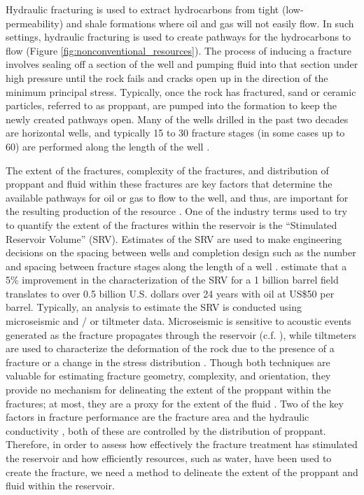 Hydraulic fracturing is used to extract hydrocarbons from tight (low-permeability) and shale formations where oil and gas will not easily flow. In such settings, hydraulic fracturing is used to create pathways for the hydrocarbons to flow (Figure \ref{fig:nonconventional_resources}). The process of inducing a fracture involves sealing off a section of the well and pumping fluid into that section under high pressure until the rock fails and cracks open up in the direction of the minimum principal stress. Typically, once the rock has fractured, sand or ceramic particles, referred to as proppant, are pumped into the formation to keep the newly created pathways open. Many of the wells drilled in the past two decades are horizontal wells, and typically 15 to 30 fracture stages (in some cases up to 60) are performed along the length of the well \citep{Maxwell2014}.

The extent of the fractures, complexity of the fractures, and distribution of proppant and fluid within these fractures are key factors that determine the available pathways for oil or gas to flow to the well, and thus, are important for the resulting production of the resource \citep{Brannon2008, Cipolla2009}. One of the industry terms used to try to quantify the extent of the fractures within the reservoir is the ``Stimulated Reservoir Volume'' (SRV). Estimates of the SRV are used to make engineering decisions on the spacing between wells and completion design such as the number and spacing between fracture stages along the length of a well \citep{Palisch2016}. \cite{Hoversten2015} estimate that a 5\% improvement in the characterization of the SRV for a 1 billion barrel field translates to over 0.5 billion U.S. dollars over 24 years with oil at US\$50 per barrel. Typically, an analysis to estimate the SRV is conducted using microseismic and / or tiltmeter data. Microseismic is sensitive to acoustic events generated as the fracture propagates through the reservoir (c.f. \cite{Mayerhofer2010, Cipolla2009, Maxwell2002, Warpinski1996}), while tiltmeters are used to characterize the deformation of the rock due to the presence of a fracture or a change in the stress distribution \citep{Mayerhofer2010, Wright1998}. Though both techniques are valuable for estimating fracture geometry, complexity, and orientation, they provide no mechanism for delineating the extent of the proppant within the fractures; at most, they are a proxy for the extent of the fluid \citep{Palisch2016}. Two of the key factors in fracture performance are the fracture area and the hydraulic conductivity \citep{Cipolla2014}, both of these are controlled by the distribution of proppant. Therefore, in order to assess how effectively the fracture treatment has stimulated the reservoir and how efficiently resources, such as water, have been used to create the fracture, we need a method to delineate the extent of the proppant and fluid within the reservoir.



